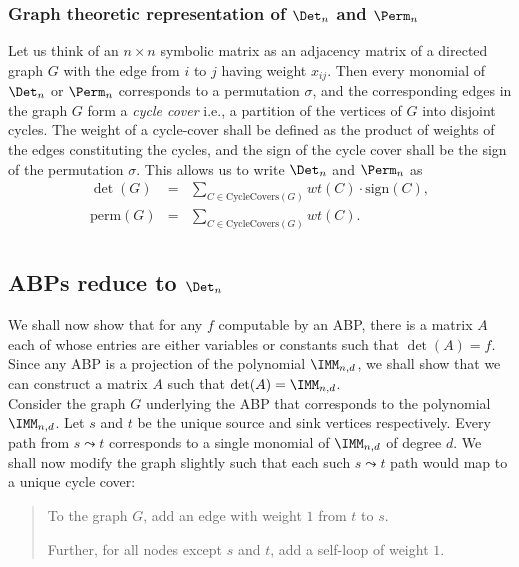 \subsubsection*{Graph theoretic representation of $\Det_n$ and $\Perm_n$}

Let us think of an $n\times n$ symbolic matrix as an adjacency matrix of a directed graph $G$ with the edge from $i$ to $j$ having weight $x_{ij}$. 
Then every monomial of $\Det_n$ or $\Perm_n$ corresponds to a permutation $\sigma$, and the corresponding edges in the graph $G$ form a \emph{cycle cover} i.e., a partition of the vertices of $G$ into disjoint cycles. 
The weight of a cycle-cover shall be defined as the product of weights of the edges constituting the cycles, and the sign of the cycle cover shall be the sign of the permutation $\sigma$. 
This allows us to write $\Det_n$ and $\Perm_n$ as
\begin{eqnarray*}
\det(G) & = & \sum_{C\in \mathrm{CycleCovers}(G)} wt(C) \cdot \mathrm{sign}(C),\\
\mathrm{perm}(G) & = & \sum_{C\in \mathrm{CycleCovers}(G)} wt(C).\\
\end{eqnarray*}

\subsection{ABPs reduce to $\Det_n$}

We shall now show that for any $f$ computable by an ABP, there is a matrix  $A$ each of whose entries are either variables or constants such that $\det(A) = f$. 
Since any ABP is a projection of the polynomial $\IMM_{n,d}$, we shall show that we can construct a matrix  $A$  such that $\det(A) = \IMM_{n,d}$. \\

Consider the graph $G$ underlying the ABP that corresponds to the polynomial $\IMM_{n,d}$. 
Let $s$ and $t$ be the unique source and sink vertices respectively. 
Every path from $s\leadsto t$ corresponds to a single monomial of $\IMM_{n,d}$ of degree $d$. 
We shall now modify the graph slightly such that each such $s\leadsto t$ path would map to a unique cycle cover:

\begin{quote}
  To the graph $G$, add an edge with weight $1$ from $t$ to $s$. 

  Further, for all nodes except $s$ and $t$, add a self-loop of weight $1$. 
\end{quote}

